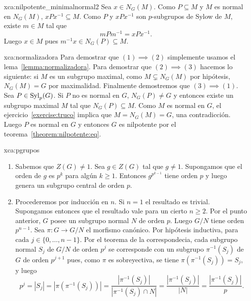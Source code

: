 \begin{sol}{xca:nilpotente_minimalnormal2}
	Sea $x\in N_G(M)$. Como $P\subseteq M$ y $M$ es normal en $N_G(M)$,
	$xPx^{-1}\subseteq M$.  Como $P$ y $xPx^{-1}$ son $p$-subgrupos de Sylow de
	$M$, existe $m\in M$ tal que 
	\[
	mPm^{-1}=xPx^{-1}.
	\]
	Luego $x\in M$ pues
	$m^{-1}x\in N_G(P)\subseteq M$. 
\end{sol}


\begin{sol}{xca:normalizadora}
	Para demostrar que $(1)\implies(2)$ simplemente usamos el
	lema~\ref{lemma:normalizadora}. Para demostrar que $(2)\implies(3)$ hacemos
	lo siguiente: si $M$ es un subgrupo maximal, como $M\subsetneq N_G(M)$ por
	hipótesis, $N_G(M)=G$ por maximalidad. Finalmente demostremos que
	$(3)\implies(1)$.  Sea $P\in\mathrm{Syl}_p(G)$. Si $P$ no es normal en $G$,
	$N_G(P)\ne G$ y entonces existe un subgrupo maximal $M$ tal que
	$N_G(P)\subseteq M$. Como $M$ es normal en $G$, el
	ejercicio~\ref{exercise:truco} implica que $M=N_G(M)=G$, una contradicción.
	Luego $P$ es normal en $G$ y entonces $G$ es nilpotente por el
	teorema~\ref{theorem:nilpotente:eq}.
\end{sol}



\begin{sol}{xca:pgrupos}
	\begin{enumerate}
		\item Sabemos que $Z(G)\ne1$. Sea $g\in Z(G)$ tal que $g\ne 1$.
			Supongamos que el orden de $g$ es $p^k$ para algún $k\geq1$.
			Entonces $g^{p^{k-1}}$ tiene orden $p$ y luego genera un subgrupo
			central de orden $p$. 
		\item Procederemos por inducción en $n$. Si $n=1$ el resultado es
			trivial.  Supongamos entonces que el resultado vale para un cierto
			$n\geq2$. Por el punto anterior, $G$ posee un subgrupo normal $N$
			de orden $p$. Luego $G/N$ tiene orden $p^{n-1}$. Sea $\pi\colon G\to G/N$ el morfismo canónico. 
			Por hipótesis
			inductiva, para cada $j\in\{0,\dots,n-1\}$. Por el teorema de la
			correspondecia, cada subgrupo normal $S_j$ de $G/N$ de orden $p^j$ se
			corresponde con un subgrupo $\pi^{-1}(S_j)$ de $G$ de orden $p^{j+1}$ pues, como
			$\pi$ es sobreyectiva, se tiene $\pi(\pi^{-1}(S_j))=S_j$, y luego
			\[
			p^j=|S_j|=|\pi(\pi^{-1}(S_j))|=\frac{|\pi^{-1}(S_j)|}{|\pi^{-1}(S_j)\cap N|}=\frac{|\pi^{-1}(S_j)|}{|N|}=\frac{|\pi^{-1}(S_j)|}{p}.
			\]
	\end{enumerate}
\end{sol}


